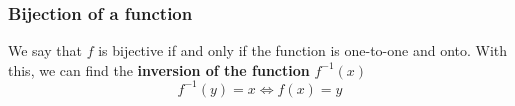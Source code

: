 \documentclass{article}
\begin{document}
\subsubsection{Bijection of a function} We say that $ f $ is bijective if and only if the function is one-to-one and onto. With this, we can find the \textbf{inversion of the function} $ f^{-1}(x) $
\begin{equation}
f^{-1}(y) = x \Leftrightarrow f(x) = y
\end{equation}

\begin{figure}[h]
\centering
{} %

\begin{tikzpicture}[x=0.75pt,y=0.75pt,yscale=-1,xscale=1]


\end{tikzpicture}
\end{figure}
\end{document}

